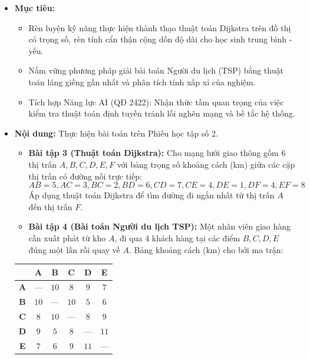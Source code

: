 \documentclass[12pt, a4paper]{article}
\begin{document}
\begin{itemize}[leftmargin=1.2cm]
    \item[a)] \textbf{Mục tiêu:}
    \begin{itemize}[leftmargin=0.6cm]
        \item Rèn luyện kỹ năng thực hiện thành thạo thuật toán Dijkstra trên đồ thị có trọng số, rèn tính cẩn thận cộng dồn độ dài cho học sinh trung bình - yếu.
        \item Nắm vững phương pháp giải bài toán Người du lịch (TSP) bằng thuật toán láng giềng gần nhất và phân tích tính xấp xỉ của nghiệm.
        \item Tích hợp Năng lực AI (QĐ 2422): Nhận thức tầm quan trọng của việc kiểm tra thuật toán định tuyến tránh lỗi nghẽn mạng và bế tắc hệ thống.
    \end{itemize}

    \item[b)] \textbf{Nội dung:} Thực hiện bài toán trên Phiếu học tập số 2.
    \begin{itemize}[leftmargin=0.6cm]
        \item \textbf{Bài tập 3 (Thuật toán Dijkstra):} Cho mạng lưới giao thông gồm 6 thị trấn $A, B, C, D, E, F$ với bảng trọng số khoảng cách (km) giữa các cặp thị trấn có đường nối trực tiếp:
        $$AB = 5, AC = 3, BC = 2, BD = 6, CD = 7, CE = 4, DE = 1, DF = 4, EF = 8$$
        Áp dụng thuật toán Dijkstra để tìm đường đi ngắn nhất từ thị trấn $A$ đến thị trấn $F$.
        \item \textbf{Bài tập 4 (Bài toán Người du lịch TSP):} Một nhân viên giao hàng cần xuất phát từ kho $A$, đi qua 4 khách hàng tại các điểm $B, C, D, E$ đúng một lần rồi quay về $A$. Bảng khoảng cách (km) cho bởi ma trận:
    \end{itemize}

    \begin{center}
    \begin{tabular}{|c|c|c|c|c|c|}
    \hline
     & \textbf{A} & \textbf{B} & \textbf{C} & \textbf{D} & \textbf{E} \\ \hline
    \textbf{A} & --- & $10$ & $8$ & $9$ & $7$ \\ \hline
    \textbf{B} & $10$ & --- & $10$ & $5$ & $6$ \\ \hline
    \textbf{C} & $8$ & $10$ & --- & $8$ & $9$ \\ \hline
    \textbf{D} & $9$ & $5$ & $8$ & --- & $11$ \\ \hline
    \textbf{E} & $7$ & $6$ & $9$ & $11$ & --- \\ \hline
    \end{tabular}
    \end{center}


\end{itemize}
\end{document}
